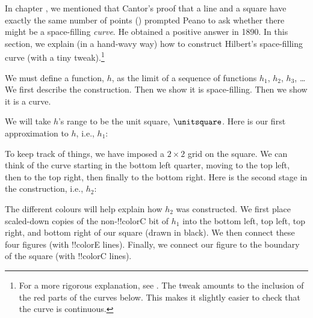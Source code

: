 \documentclass[../../../include/open-logic-section]{subfiles}
\begin{document}

In chapter , we mentioned that Cantor's proof that
a line and a square have exactly the same number of points
() prompted Peano to
ask whether there might be a space-filling \emph{curve}. He obtained a
positive answer in 1890. In this section, we explain (in a
hand-wavy way) how to construct Hilbert's space-filling curve (with a
tiny tweak).\footnote{For a more rigorous explanation, see
\cite{Rose2010}. The tweak amounts to the inclusion of the red
parts of the curves below. This makes it slightly easier to check that
the curve is continuous.}

We must define a function, $h$, as the limit of a sequence of functions $h_1$, $h_2$, $h_3$, \dots\@ We first describe the construction. Then we show it is space-filling. Then we show it is a curve. 

We will take $h$'s range to be the unit square, $\unitsquare$. Here is our first approximation to $h$, i.e., $h_1$:
\begin{center}
\end{center}
To keep track of things, we have imposed a $2 \times 2$ grid on the square. We can think of the curve starting in the bottom left quarter, moving to the top left, then to the top right, then finally to the bottom right. Here is the second stage in the construction, i.e., $h_2$:
\begin{center}
\end{center}
The different colours will help explain how $h_2$ was constructed. We first place scaled-down copies of the non-!!{colorC} bit of $h_1$ into the bottom left, top left, top right, and bottom right of our square (drawn in black). We then connect these four figures (with !!{colorE} lines). Finally, we connect our figure to the boundary of the square (with !!{colorC} lines).
\end{document}
